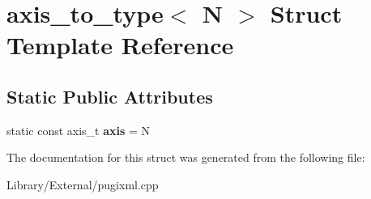 \hypertarget{structaxis__to__type}{}\section{axis\+\_\+to\+\_\+type$<$ N $>$ Struct Template Reference}
\label{structaxis__to__type}
\subsection*{Static Public Attributes}
\begin{DoxyCompactItemize}
\item 
\hypertarget{structaxis__to__type_ac9d75681918ad98c980db0f49b570b50}{}static const axis\+\_\+t {\bfseries axis} = N\label{structaxis__to__type_ac9d75681918ad98c980db0f49b570b50}

\end{DoxyCompactItemize}


The documentation for this struct was generated from the following file\+:\begin{DoxyCompactItemize}
\item 
Library/\+External/pugixml.\+cpp\end{DoxyCompactItemize}
